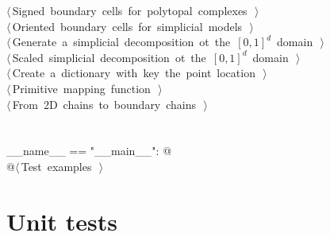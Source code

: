 \documentclass[11pt,oneside]{article}    %
\begin{document}
\begin{flushleft}
\begin{list}{}{}
\mbox{}\verb@@\hbox{$\langle\,$Signed boundary cells for polytopal complexes\nobreak\ {\footnotesize {}}$\,\rangle$}\verb@@\\
\mbox{}\verb@@\hbox{$\langle\,$Oriented boundary cells for simplicial models\nobreak\ {\footnotesize {}}$\,\rangle$}\verb@@\\
\mbox{}\verb@@\hbox{$\langle\,$Generate a simplicial decomposition ot the $[0,1]^d$ domain\nobreak\ {\footnotesize {}}$\,\rangle$}\verb@@\\
\mbox{}\verb@@\hbox{$\langle\,$Scaled simplicial decomposition ot the $[0,1]^d$ domain\nobreak\ {\footnotesize {}}$\,\rangle$}\verb@@\\
\mbox{}\verb@@\hbox{$\langle\,$Create a dictionary with key the point location\nobreak\ {\footnotesize {}}$\,\rangle$}\verb@@\\
\mbox{}\verb@@\hbox{$\langle\,$Primitive mapping function\nobreak\ {\footnotesize {}}$\,\rangle$}\verb@@\\
\mbox{}\verb@@\hbox{$\langle\,$From 2D chains to boundary chains\nobreak\ {\footnotesize {}}$\,\rangle$}\verb@@\\
\mbox{}\verb@@\\
\mbox{}\verb@@\\
\mbox{}\verb@if __name__ == "__main__": @\\
\mbox{}\verb@    @\hbox{$\langle\,$Test examples\nobreak\ {\footnotesize {}}$\,\rangle$}\verb@@\\
\mbox{}\verb@@{\NWsep}
\end{list}
\vspace{-2ex}
\end{flushleft}

\section{Unit tests}
\end{document}
